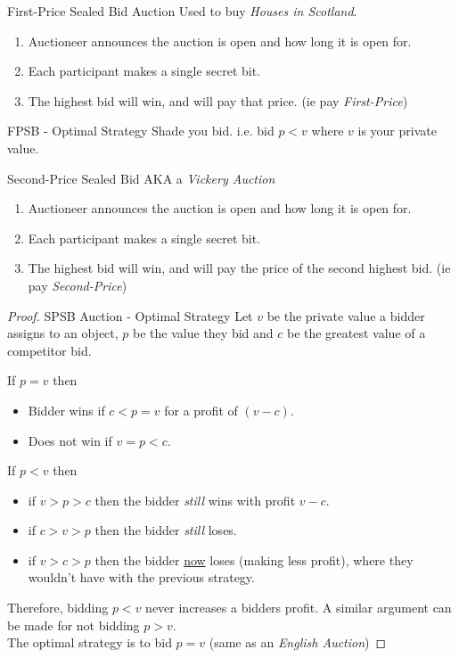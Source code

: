 \documentclass[11pt,a4paper]{article}
\begin{document}
\begin{definition}{First-Price Sealed Bid Auction}
  Used to buy \textit{Houses in Scotland}.
  \begin{enumerate}
    \item Auctioneer announces the auction is open and how long it is open for.
    \item Each participant makes a single secret bit.
    \item The highest bid will win, and will pay that price. (ie pay \textit{First-Price})
  \end{enumerate}
\end{definition}

\begin{proposition}{FPSB - Optimal Strategy}
  Shade you bid. i.e. bid $p<v$ where $v$ is your private value.
\end{proposition}

\begin{definition}{Second-Price Sealed Bid}
  AKA a \textit{Vickery Auction}
  \begin{enumerate}
    \item Auctioneer announces the auction is open and how long it is open for.
    \item Each participant makes a single secret bit.
    \item The highest bid will win, and will pay the price of the second highest bid. (ie pay \textit{Second-Price})
  \end{enumerate}
\end{definition}

\begin{proof}{SPSB Auction - Optimal Strategy}
  Let $v$ be the private value a bidder assigns to an object, $p$ be the value they bid and $c$ be the greatest value of a competitor bid.
  \par If $p=v$ then
  \begin{itemize}
    \item Bidder wins if $c<p=v$ for a profit of $(v-c)$.
    \item Does not win if $v=p<c$.
  \end{itemize}
  If $p<v$ then
  \begin{itemize}
    \item if $v>p>c$ then the bidder \textit{still} wins with profit $v-c$.
    \item if $c>v>p$ then the bidder \textit{still} loses.
    \item if $v>c>p$ then the bidder \underline{now} loses (making less profit), where they wouldn't have with the previous strategy.
  \end{itemize}
  Therefore, bidding $p<v$ never increases a bidders profit. A similar argument can be made for not bidding $p>v$.\\
  The optimal strategy is to bid $p=v$ (same as an \textit{English Auction})
\end{proof}
\end{document}
